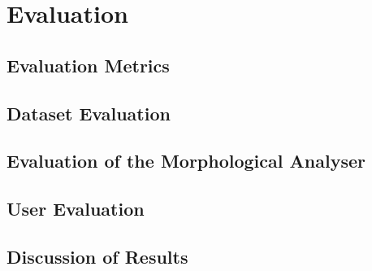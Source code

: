 \graphicspath{{content/chapters/5_evaluation/figures/}}

\chapter{Evaluation}%
\label{chp:evaluation}

\section{Evaluation Metrics}
\label{sec:evaluation_metrics}

\section{Dataset Evaluation}%
\label{sec:dataset_evaluation}

\section{Evaluation of the Morphological Analyser}
\label{sec:evaluation_of_the_morphological_analyser}

\section{User Evaluation}%
\label{sec:user_evaluation}

\section{Discussion of Results}%
\label{sec:discussion_of_results}
